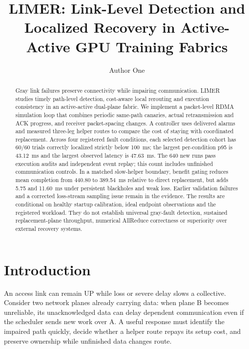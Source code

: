 \documentclass[sigconf]{acmart}
\begin{document}
\title{LIMER: Link-Level Detection and Localized Recovery
in Active-Active GPU Training Fabrics}

\author{Author One}

\begin{abstract}
Gray link failures preserve connectivity while impairing communication.
LIMER studies timely path-level detection, cost-aware local rerouting and
execution consistency in an active-active dual-plane fabric. We implement
a packet-level RDMA simulation loop that combines periodic same-path
canaries, actual retransmission and ACK progress, and receiver packet-spacing
changes. A controller uses delivered alarms and measured three-leg helper
routes to compare the cost of staying with coordinated replacement.
Across four registered fault conditions, each selected detection cohort
has 60/60 trials correctly localized strictly below 100~ms; the largest
per-condition p95 is 43.12~ms and the largest observed latency is 47.63~ms.
The 640 new runs pass execution audits and independent event replay;
this count includes unfinished communication controls. In a matched
slow-helper boundary, benefit gating reduces mean completion from 440.80
to 389.54~ms relative to direct replacement, but adds 5.75 and 11.60~ms
under persistent blackholes and weak loss. Earlier validation failures
and a corrected loss-stream sampling issue remain in the evidence.
The results are conditional on healthy startup calibration, ideal endpoint
observations and the registered workload. They do not establish universal
gray-fault detection, sustained replacement-plane throughput, numerical
AllReduce correctness or superiority over external recovery systems.
\end{abstract}

\maketitle

\section{Introduction}
An access link can remain UP while loss or severe delay slows a collective.
Consider two network planes already carrying data: when plane B becomes
unreliable, its unacknowledged data can delay dependent communication even
if the scheduler sends new work over A. A useful response must identify
the impaired path quickly, decide whether a helper route repays its setup
cost, and preserve ownership while unfinished data changes route.
\end{document}
